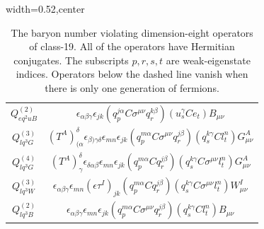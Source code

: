 \begin{table}[H]
\begin{center}
\begin{adjustbox}{width=0.52\textwidth,center}
\begin{minipage}[t]{7.8cm}
\begin{tabular}[t]{c|c}
%
$Q_{eq^2uB}^{(2)}$  &  $\epsilon_{\alpha\beta\gamma} \epsilon_{jk} (q_p^{j\alpha} C \sigma^{\mu\nu} q_r^{k\beta}) (u_s^{\gamma} C e_t) B_{\mu\nu}$ \\
%
$Q_{lq^3G}^{(3)}$ & $(T^A)_{(\alpha}^\delta \epsilon_{\beta)\gamma\delta} \epsilon_{mn} \epsilon_{jk} (q_p^{m\alpha} C \sigma^{\mu\nu} q_r^{j\beta}) (q_s^{k\gamma} C l_t^n) G^A_{\mu\nu}$ \\ 
%
$Q_{lq^3G}^{(4)}$ & $(T^A)_\gamma^\delta \epsilon_{\delta\alpha\beta}  \epsilon_{mn} \epsilon_{jk} (q_p^{m\alpha} C q_r^{j\beta}) (q_s^{k\gamma} C \sigma^{\mu\nu}  l_t^n) G^A_{\mu\nu}$ \\
%
$Q_{lq^3W}^{(3)}$  &  $\epsilon_{\alpha\beta\gamma} \epsilon_{mn} (\epsilon \tau^I)_{jk} (q_p^{m\alpha} C q_r^{j\beta}) (q_s^{k\gamma} C \sigma^{\mu\nu} l_t^n) W^I_{\mu\nu}$ \\
%
$Q_{lq^3B}^{(2)}$ & $\epsilon_{\alpha\beta\gamma} \epsilon_{mn} \epsilon_{jk} (q_p^{m\alpha} C \sigma^{\mu\nu} q_r^{j\beta}) (q_s^{k\gamma} C l_t^n) B_{\mu\nu}$ 
\end{tabular}
\end{minipage}
\end{adjustbox}
\end{center}
\caption{The baryon number violating dimension-eight operators of class-19. 
All of the operators have Hermitian conjugates. 
The subscripts $p, r, s, t$ are weak-eigenstate indices. 
Operators below the dashed line vanish when there is only one generation of fermions.}
\label{tab:smeft8class_19_slashedB}
\end{table}

